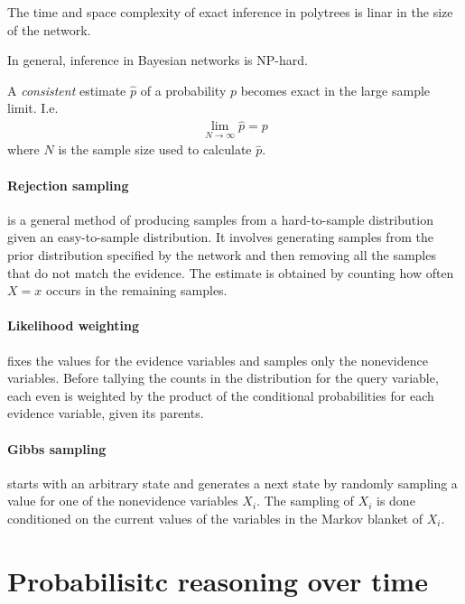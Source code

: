 \documentclass{article}
\begin{document}
\begin{theorem}
    The time and space complexity of exact inference in polytrees is linar in the size of the network.
\end{theorem}

\begin{theorem}
    In general, inference in Bayesian networks is NP-hard.
\end{theorem}

\begin{definition}
    A \emph{consistent} estimate $\hat p$ of a probability $p$ becomes exact in the large sample limit. I.e. 
    \begin{align*}
        \lim_{N\to\infty} \hat p = p
    \end{align*}
    where $N$ is the sample size used to calculate $\hat p$.
\end{definition}

\paragraph{Rejection sampling} is a general method of producing samples from a hard-to-sample
distribution given an easy-to-sample distribution. It involves generating samples from the
prior distribution specified by the network and then removing all the samples that do not
match the evidence. The estimate is obtained by counting how often $X=x$ occurs in the remaining
samples.

\paragraph{Likelihood weighting} fixes the values for the evidence variables and samples
only the nonevidence variables. Before tallying the counts in the distribution for the query
variable, each even is weighted by the product of the conditional probabilities for each evidence 
variable, given its parents.

\paragraph{Gibbs sampling} starts with an arbitrary state and generates a next state by randomly
sampling a value for one of the nonevidence variables $X_i$. The sampling of $X_i$ is done
conditioned on the current values of the variables in the Markov blanket of $X_i$.

\section{Probabilisitc reasoning over time}
\end{document}
